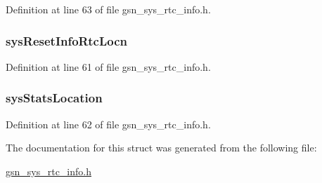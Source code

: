 Definition at line 63 of file gsn\_\-sys\_\-rtc\_\-info.h.

\hypertarget{a00259_abcb215deb500d73ccf5760cab85861fc}{
\subsubsection[{sysResetInfoRtcLocn}]{ {\bf sysResetInfoRtcLocn}}}
\label{a00259_abcb215deb500d73ccf5760cab85861fc}


Definition at line 61 of file gsn\_\-sys\_\-rtc\_\-info.h.

\hypertarget{a00259_aea6f9efcd46664e1ebcf3f9fa915de69}{
\subsubsection[{sysStatsLocation}]{ {\bf sysStatsLocation}}}
\label{a00259_aea6f9efcd46664e1ebcf3f9fa915de69}


Definition at line 62 of file gsn\_\-sys\_\-rtc\_\-info.h.



The documentation for this struct was generated from the following file:\begin{DoxyCompactItemize}
\item 
\hyperlink{a00595}{gsn\_\-sys\_\-rtc\_\-info.h}\end{DoxyCompactItemize}

